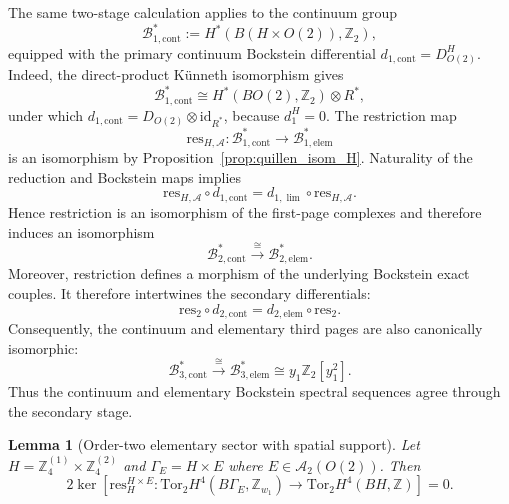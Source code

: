 \documentclass[aps,prx,reprint,superscriptaddress,twocolumn,amsmath,amssymb,amsfonts, nofootinbib]{revtex4-2}
\newcommand{\res}{\text{res}}
\newcommand{\tor}{\text{Tor}}
\theoremstyle{apsstyle}
\newtheorem{lemma}{Lemma}
\begin{document}
\noindent The same two-stage calculation applies to the continuum group 
\begin{equation*} 
\mathcal B_{1,\mathrm{cont}}^{*} := H^{*}(B(H\times O(2)),\mathbb Z_2), 
\end{equation*} 
equipped with the primary continuum Bockstein differential $d_{1,\mathrm{cont}}=D_{O(2)}^{H}$. Indeed, the direct-product K\"unneth isomorphism gives 
\begin{equation*} 
\mathcal B_{1,\mathrm{cont}}^{*} \cong H^{*}(BO(2),\mathbb Z_2)\otimes R^{*}, 
\end{equation*} 
under which $d_{1,\mathrm{cont}} = D_{O(2)}\otimes\mathrm{id}_{R^{*}}$, because $d_1^{H}=0$. The restriction map 
\begin{equation} 
\res_{H,\mathcal A}: \mathcal B_{1,\mathrm{cont}}^{*} \longrightarrow \mathcal B_{1,\mathrm{elem}}^{*} 
\end{equation} 
is an isomorphism by Proposition~\ref{prop:quillen_isom_H}. Naturality of the reduction and Bockstein maps implies \begin{equation*} \res_{H,\mathcal A}\circ d_{1,\mathrm{cont}} = d_{1,\lim}\circ\res_{H,\mathcal A}. \end{equation*} Hence restriction is an isomorphism of the first-page complexes and therefore induces an isomorphism \begin{equation*} \mathcal B_{2,\mathrm{cont}}^{*} \xrightarrow{\cong} \mathcal B_{2,\mathrm{elem}}^{*}. \end{equation*} Moreover, restriction defines a morphism of the underlying Bockstein exact couples. It therefore intertwines the secondary differentials: \begin{equation*} \res_{2}\circ d_{2,\mathrm{cont}} = d_{2,\mathrm{elem}}\circ\res_{2}. \end{equation*} Consequently, the continuum and elementary third pages are also canonically isomorphic: \begin{equation*} \mathcal B_{3,\mathrm{cont}}^{*} \xrightarrow{\cong} \mathcal B_{3,\mathrm{elem}}^{*} \cong y_1\mathbb Z_2[y_1^2]. \end{equation*} Thus the continuum and elementary Bockstein spectral sequences agree through the secondary stage.

\bigskip 

\begin{lemma}[Order-two elementary sector with spatial support]
\label{lem:Z4Z4_spatial_kernel_order2}
Let $H=\mathbb Z_4^{(1)}\times\mathbb Z_4^{(2)}$ and $\Gamma_{E}=H \times E$ where
$E\in\mathcal A_2(O(2))$. Then
\begin{equation}
2\ker\left[
\res^{H\times E}_{H}:
\tor_2 H^4\left(B\Gamma_E,\mathbb Z_{w_1}\right)
\to
\tor_2 H^4(BH,\mathbb Z)
\right]
=0.
\label{eq:Z4Z4_spatial_kernel_order2}
\end{equation}
\end{lemma}
\end{document}
